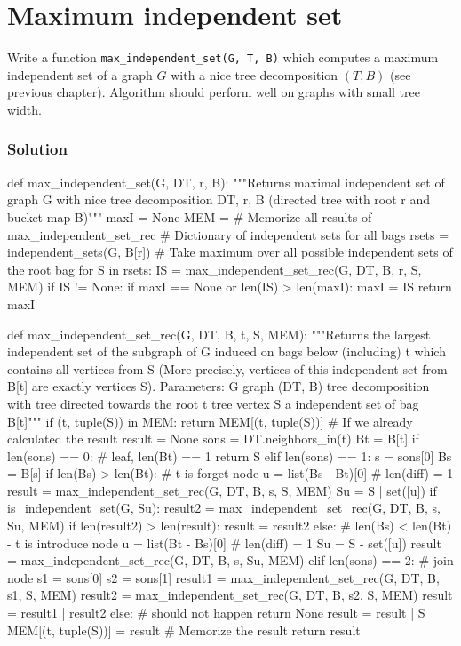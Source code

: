 \chapter{Maximum independent set}

Write a function \verb`max_independent_set(G, T, B)` which computes a maximum independent set of a graph $G$ with a nice tree decomposition $(T, B)$ (see previous chapter). Algorithm should perform well on graphs with small tree width.

\subsection*{Solution}

\begin{sageCell}
def max_independent_set(G, DT, r, B):
    """Returns maximal independent set of graph G with nice tree decomposition DT, r, B (directed tree with root r and
    bucket map B)"""
    maxI = None
    MEM = {}  # Memorize all results of max_independent_set_rec
    # Dictionary of independent sets for all bags
    rsets = independent_sets(G, B[r])
    # Take maximum over all possible independent sets of the root bag
    for S in rsets:
        IS = max_independent_set_rec(G, DT, B, r, S, MEM)
        if IS != None:
            if maxI == None or len(IS) > len(maxI):
                maxI = IS
    return maxI

def max_independent_set_rec(G, DT, B, t, S, MEM):
    """Returns the largest independent set of the subgraph of G induced on bags below (including) t
    which contains all vertices from S (More precisely, vertices of this independent set from B[t] are exactly vertices S).
    Parameters:
      G        graph
      (DT, B)  tree decomposition with tree directed towards the root
      t        tree vertex
      S        a independent set of bag B[t]"""
    if (t, tuple(S)) in MEM:
        return MEM[(t, tuple(S))]  # If we already calculated the result
    result = None
    sons = DT.neighbors_in(t)
    Bt = B[t]
    if len(sons) == 0: # leaf, len(Bt) == 1
        return S
    elif len(sons) == 1:
        s = sons[0]
        Bs = B[s]
        if len(Bs) > len(Bt): # t is forget node
            u = list(Bs - Bt)[0]  # len(diff) = 1
            result = max_independent_set_rec(G, DT, B, s, S, MEM)
            Su = S | set([u])
            if is_independent_set(G, Su):
                result2 = max_independent_set_rec(G, DT, B, s, Su, MEM)
                if len(result2) > len(result):
                    result = result2
        else: # len(Bs) < len(Bt) - t is introduce node
            u = list(Bt - Bs)[0]  # len(diff) = 1
            Su = S - set([u])
            result = max_independent_set_rec(G, DT, B, s, Su, MEM)
    elif len(sons) == 2:  # join node
        s1 = sons[0]
        s2 = sons[1]
        result1 = max_independent_set_rec(G, DT, B, s1, S, MEM)
        result2 = max_independent_set_rec(G, DT, B, s2, S, MEM)
        result = result1 | result2
    else:
        # should not happen
        return None
    result = result | S
    MEM[(t, tuple(S))] = result  # Memorize the result
    return result
\end{sageCell}
